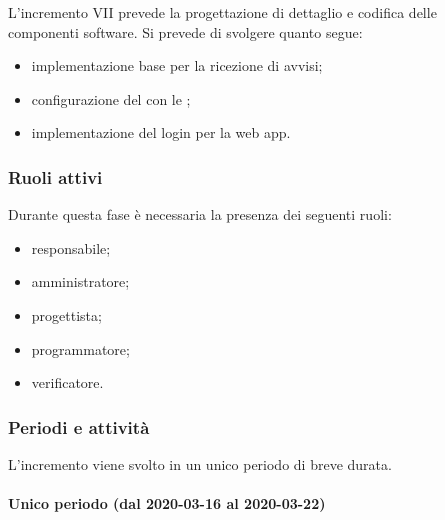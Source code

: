 			L'incremento VII prevede la progettazione di dettaglio e codifica delle componenti software. Si prevede di svolgere quanto segue:
			\begin{itemize}
				\item implementazione base  per la ricezione di avvisi;
				\item configurazione del  con le ;
				\item implementazione del login per la web app.
			\end{itemize}
			
			\subsubsection{Ruoli attivi}
			
				Durante questa fase è necessaria la presenza dei seguenti ruoli:
				\begin{itemize}
					\item responsabile;
					\item amministratore;
					\item progettista;
					\item programmatore;
					\item verificatore.
				\end{itemize}
			
			\subsubsection{Periodi e attività}
			
				L'incremento viene svolto in un unico periodo di breve durata.
				
				\paragraph{Unico periodo (dal 2020-03-16 al 2020-03-22)}
				
